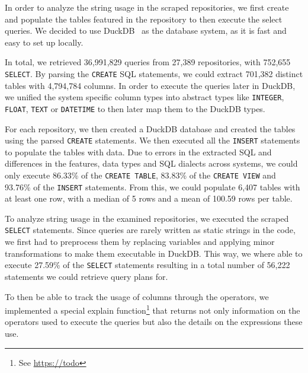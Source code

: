 
In order to analyze the string usage in the scraped repositories, we first create and populate the tables featured in the
repository to then execute the select queries.
We decided to use DuckDB~\cite{raasveldt_duckdb_2019} as the database system, as it is fast
and easy to set up locally.

In total, we retrieved 36,991,829 queries from 27,389 repositories,
with 752,655 \texttt{SELECT}. By parsing the \texttt{CREATE} SQL statements, we could extract
701,382 distinct tables with 4,794,784 columns. In order to execute the queries
later in DuckDB, we unified the system specific column types into abstract types like \texttt{INTEGER}, \texttt{FLOAT}, 
\texttt{TEXT} or \texttt{DATETIME} to then later map them to the DuckDB types. 

For each repository, we then created a DuckDB database and created the tables using the parsed \texttt{CREATE} statements.
We then executed all the \texttt{INSERT} statements to populate the tables with data. Due to errors in the extracted 
SQL and differences in the features, data types and SQL dialects across systems, we could only execute 86.33\% 
of the \texttt{CREATE TABLE}, 83.83\% of the \texttt{CREATE VIEW} and 93.76\% of the \texttt{INSERT} statements. 
From this, we could populate 6,407 tables with at least one row, 
with a median of 5 rows and a mean of 100.59 rows per table.

To analyze string usage in the examined repositories, we executed the scraped \texttt{SELECT} statements.
Since queries are rarely written as static strings in the code, we first had to preprocess them by 
replacing variables and applying minor transformations to make them executable in DuckDB. This way, we where 
able to execute 27.59\% of the \texttt{SELECT} statements resulting in a 
total number of 56,222 statements we could retrieve query plans for. 

To then be able to track the usage of columns through the operators, we implemented a special 
explain function\footnote{See \url{https://todo}} that returns not only information on 
the operators used to execute the queries but also the details on the expressions these use. 